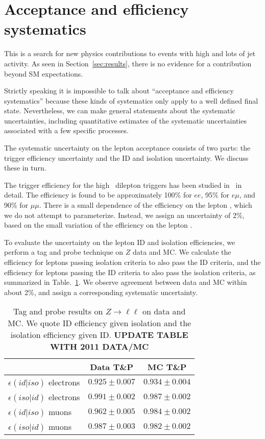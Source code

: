 \section{Acceptance and efficiency systematics}
\label{sec:systematics}

This is a search for new physics contributions to 
events with high \met and lots of jet activity.
As seen in Section~\ref{sec:results}, there is no
evidence for a contribution beyond SM expectations.

Strictly speaking it is impossible to talk about 
``acceptance and efficiency systematics'' because these kinds of
systematics only apply to a well defined final state.
Nevertheless, we can make general statements about the 
systematic uncertainties, including quantitative
estimates of the systematic uncertainties associated with
a few specific processes. 

The systematic uncertainty on the lepton acceptance consists
of two parts: the trigger efficiency uncertainty and the 
ID and isolation uncertainty.  We discuss these in turn.

The trigger efficiency for the high \pt\ dilepton triggers has been studied
in~\cite{ref:HWW} in detail. The efficiency is found to be approximately
100\% for $ee$, 95\% for $e\mu$, and 90\% for $\mu\mu$. There is a small
dependence of the efficiency on the lepton \pt, which we do not attempt
to parameterize. Instead, we assign an uncertainty of 2\%, based on the
small variation of the efficiency on the lepton \pt.

To evaluate the uncertainty on the lepton ID and isolation efficiencies,
we perform a tag and probe technique on $Z$ data and MC. We calculate
the efficiency for leptons passing isolation criteria to also pass
the ID criteria, and the efficiency for leptons passing the ID criteria
to also pass the isolation criteria, as summarized in Table.~\ref{tab:tagandprobe}.
We observe agreement between data and MC within about 2\%, and assign 
a corresponding systematic uncertainty.

\begin{table}[hbt]
\begin{center}
\caption{\label{tab:tagandprobe} Tag and probe results on $Z \to \ell \ell$
on data and MC.  We quote ID efficiency given isolation and 
the isolation efficiency given ID. {\bf UPDATE TABLE WITH 2011 DATA/MC}}
\vspace{.25cm}
\begin{tabular}{|l||c|c|}
\hline
                             & Data  T\&P      & MC T\&P             \\  
\hline
$\epsilon(id|iso)$ electrons & $0.925 \pm 0.007$ & $0.934 \pm 0.004$ \\
$\epsilon(iso|id)$ electrons & $0.991 \pm 0.002$ & $0.987 \pm 0.002$ \\
$\epsilon(id|iso)$ muons     & $0.962 \pm 0.005$ & $0.984 \pm 0.002$ \\
$\epsilon(iso|id)$ muons     & $0.987 \pm 0.003$ & $0.982 \pm 0.002$ \\ 
\hline
\end{tabular}
\end{center}
\end{table}

